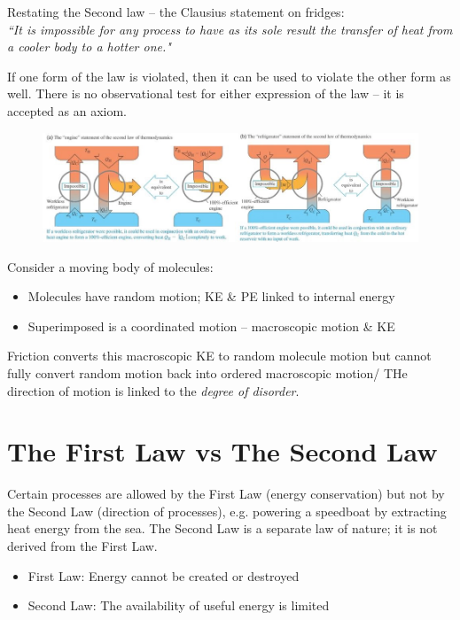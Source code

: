 \documentclass[a4paper, 11pt, normalem]{report}
\begin{document}
Restating the Second law -- the Clausius statement on fridges: \\
\emph{``It is impossible for any process to have as its sole result the transfer of heat from a cooler body to a hotter one."}

If one form of the law is violated, then it can be used to violate the other form as well.
There is no observational test for either expression of the law -- it is accepted as an axiom.
\begin{figure}[H]
    \centering
    \includegraphics[scale=0.69]{Impossible.jpg}
\end{figure}
Consider a moving body of molecules:
\begin{itemize}
	\item Molecules have random motion; KE \& PE linked to internal energy
	\item Superimposed is a coordinated motion -- macroscopic motion \& KE
\end{itemize}
Friction converts this macroscopic KE to random molecule motion but cannot fully convert random motion back into ordered macroscopic motion/
THe direction of motion is linked to the \emph{degree of disorder}.

\section{The First Law vs The Second Law}
Certain processes are allowed by the First Law (energy conservation) but not by the Second Law (direction of processes), e.g. powering a speedboat by extracting heat energy from the sea.
The Second Law is a separate law of nature; it is not derived from the First Law.

\begin{itemize}
    \item First Law: Energy cannot be created or destroyed 
    \item Second Law: The availability of useful energy is limited
\end{itemize}
\end{document}
